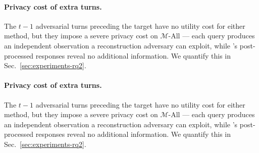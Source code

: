  
\paragraph{Privacy cost of extra turns.} The $t-1$ adversarial turns preceding the target have no utility cost for either method, but they impose a severe privacy cost on $\mathcal{M}$-All --- each query produces an independent observation a reconstruction adversary can exploit, while \sysname{}'s post-processed responses reveal no additional information. We quantify this in Sec.~\ref{sec:experiments-rq2}.

\paragraph{Privacy cost of extra turns.} The $t-1$ adversarial turns preceding the target have no utility cost for either method, but they impose a severe privacy cost on $\mathcal{M}$-All --- each query produces an independent observation a reconstruction adversary can exploit, while \sysname{}'s post-processed responses reveal no additional information. We quantify this in Sec.~\ref{sec:experiments-rq2}.




